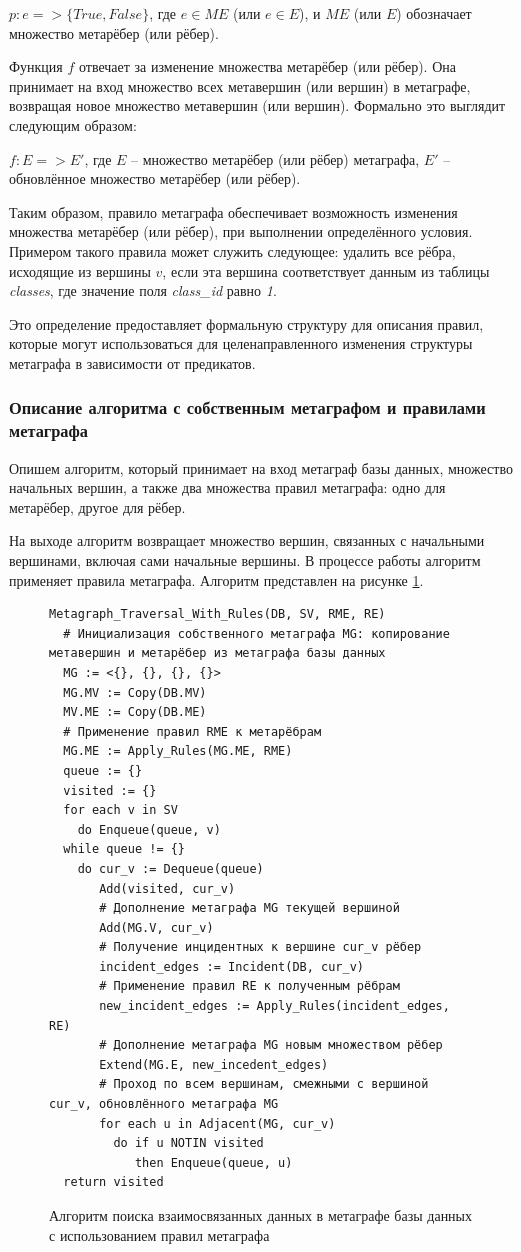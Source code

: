 $p: e => \{True, False\}$, где $e \in ME$ (или $e \in E$), и $ME$ (или $E$) обозначает множество метарёбер (или рёбер).

Функция $f$ отвечает за изменение множества метарёбер (или рёбер). Она принимает на вход множество всех метавершин (или вершин) в метаграфе, возвращая новое множество метавершин (или вершин). Формально это выглядит следующим образом:

$f: E => E'$, где $E$ -- множество метарёбер (или рёбер) метаграфа, $E'$ -- обновлённое множество метарёбер (или рёбер).

Таким образом, правило метаграфа обеспечивает возможность изменения множества метарёбер (или рёбер), при выполнении определённого условия. Примером такого правила может служить следующее: удалить все рёбра, исходящие из вершины $v$, если эта вершина соответствует данным из таблицы \textit{classes}, где значение поля \textit{class\_id} равно \textit{1}.

Это определение предоставляет формальную структуру для описания правил, которые могут использоваться для целенаправленного изменения структуры метаграфа в зависимости от предикатов.

\subsubsection{Описание алгоритма с собственным метаграфом и правилами метаграфа}
Опишем алгоритм, который принимает на вход метаграф базы данных, множество начальных вершин, а также два множества правил метаграфа: одно для метарёбер, другое для рёбер.

На выходе алгоритм возвращает множество вершин, связанных с начальными вершинами, включая сами начальные вершины. В процессе работы алгоритм применяет правила метаграфа. Алгоритм представлен на рисунке \ref{algorithm-with-rules}.

\begin{figure}
  \begin{lstlisting}
Metagraph_Traversal_With_Rules(DB, SV, RME, RE)
  # Инициализация собственного метаграфа MG: копирование метавершин и метарёбер из метаграфа базы данных
  MG := <{}, {}, {}, {}>
  MG.MV := Copy(DB.MV)
  MV.ME := Copy(DB.ME)
  # Применение правил RME к метарёбрам
  MG.ME := Apply_Rules(MG.ME, RME)
  queue := {}
  visited := {}
  for each v in SV
    do Enqueue(queue, v)
  while queue != {}
    do cur_v := Dequeue(queue)
       Add(visited, cur_v)
       # Дополнение метаграфа MG текущей вершиной
       Add(MG.V, cur_v)
       # Получение инцидентных к вершине cur_v рёбер
       incident_edges := Incident(DB, cur_v)
       # Применение правил RE к полученным рёбрам
       new_incident_edges := Apply_Rules(incident_edges, RE)
       # Дополнение метаграфа MG новым множеством рёбер
       Extend(MG.E, new_incedent_edges)
       # Проход по всем вершинам, смежными с вершиной cur_v, обновлённого метаграфа MG
       for each u in Adjacent(MG, cur_v)
         do if u NOTIN visited
            then Enqueue(queue, u)
  return visited
  \end{lstlisting}
  \caption{Алгоритм поиска взаимосвязанных данных в метаграфе базы данных с использованием правил метаграфа}
  \label{algorithm-with-rules}
\end{figure}

